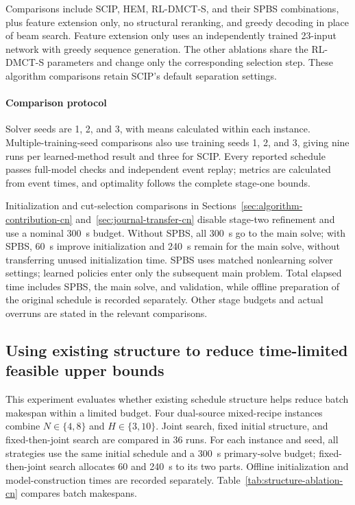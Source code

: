 \documentclass[final,5p,times,twocolumn]{elsarticle}
\newcounter{algorithm}
\begin{document}
Comparisons include SCIP, HEM, RL-DMCT-S, and their SPBS combinations, plus feature extension only, no structural reranking, and greedy decoding in place of beam search. Feature extension only uses an independently trained 23-input network with greedy sequence generation. The other ablations share the RL-DMCT-S parameters and change only the corresponding selection step. These algorithm comparisons retain SCIP's default separation settings.

\paragraph{Comparison protocol}
Solver seeds are 1, 2, and 3, with means calculated within each instance. Multiple-training-seed comparisons also use training seeds 1, 2, and 3, giving nine runs per learned-method result and three for SCIP. Every reported schedule passes full-model checks and independent event replay; metrics are calculated from event times, and optimality follows the complete stage-one bounds.

Initialization and cut-selection comparisons in Sections~\ref{sec:algorithm-contribution-cn} and~\ref{sec:journal-transfer-cn} disable stage-two refinement and use a nominal 300~s budget. Without SPBS, all 300~s go to the main solve; with SPBS, 60~s improve initialization and 240~s remain for the main solve, without transferring unused initialization time. SPBS uses matched nonlearning solver settings; learned policies enter only the subsequent main problem. Total elapsed time includes SPBS, the main solve, and validation, while offline preparation of the original schedule is recorded separately. Other stage budgets and actual overruns are stated in the relevant comparisons.

\subsection{Using existing structure to reduce time-limited feasible upper bounds}
\label{sec:structure-comparison-cn}
This experiment evaluates whether existing schedule structure helps reduce batch makespan within a limited budget. Four dual-source mixed-recipe instances combine $N\in\{4,8\}$ and $H\in\{3,10\}$. Joint search, fixed initial structure, and fixed-then-joint search are compared in 36 runs. For each instance and seed, all strategies use the same initial schedule and a 300~s primary-solve budget; fixed-then-joint search allocates 60 and 240~s to its two parts. Offline initialization and model-construction times are recorded separately. Table~\ref{tab:structure-ablation-cn} compares batch makespans.
\end{document}
